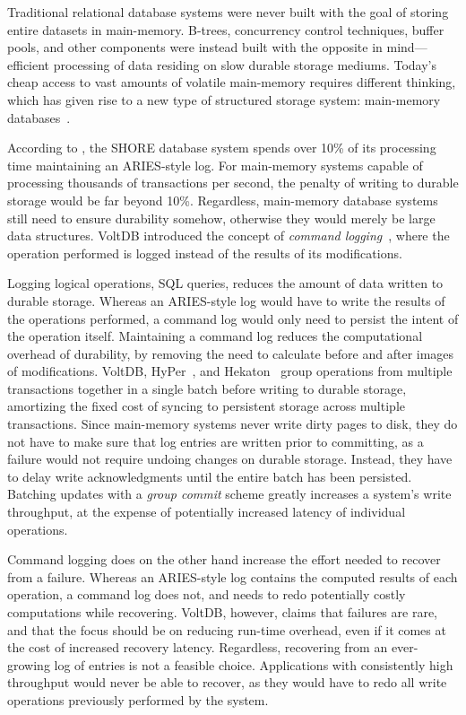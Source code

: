 Traditional relational database systems were never built with the goal of
storing entire datasets in main-memory. B-trees, concurrency control techniques,
buffer pools, and other components were instead built with the opposite in
mind---efficient processing of data residing on slow durable storage mediums.
Today's cheap access to vast amounts of volatile main-memory requires different
thinking, which has given rise to a new type of structured storage system:
main-memory databases~\cite{main-memory}.

According to \cite{oltp}, the SHORE
database system spends over 10\% of its processing time maintaining an
ARIES-style log. For main-memory systems capable of processing thousands of
transactions per second, the penalty of writing to durable storage would be far
beyond 10\%. Regardless, main-memory database systems still need to ensure
durability somehow, otherwise they would merely be large data structures. VoltDB
introduced the concept of \textit{command logging}~\cite{voltdb-recovery}, where
the operation performed is logged instead of the results of its modifications.

Logging logical operations, \eg SQL queries, reduces the amount of data written
to durable storage. Whereas an ARIES-style log would have to write the results
of the operations performed, a command log would only need to persist the intent
of the operation itself. Maintaining a command log reduces the computational
overhead of durability, by removing the need to calculate before and after
images of modifications. VoltDB, HyPer~\cite{hyper}, and Hekaton~\cite{hekaton}
group operations from multiple transactions together in a single batch before
writing to durable storage, amortizing the fixed cost of syncing to persistent
storage across multiple transactions. Since main-memory systems never write
dirty pages to disk, they do not have to make sure that log entries are written
prior to committing, as a failure would not require undoing changes on durable
storage. Instead, they have to delay write acknowledgments until the entire
batch has been persisted. Batching updates with a \textit{group commit} scheme
greatly increases a system's write throughput, at the expense of potentially
increased latency of individual operations.

Command logging does on the other hand increase the effort needed to recover
from a failure. Whereas an ARIES-style log contains the computed results of each
operation, a command log does not, and needs to redo potentially costly
computations while recovering. VoltDB, however, claims that failures are rare,
and that the focus should be on reducing run-time overhead, even if it comes at
the cost of increased recovery latency. Regardless, recovering from an
ever-growing log of entries is not a feasible choice. Applications with
consistently high throughput would never be able to recover, as they would have
to redo all write operations previously performed by the system.

